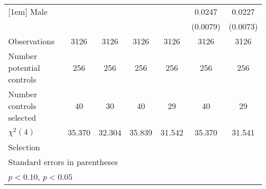{\begin{tabular}{l*{6}{c}}
[1em]
\hspace{3mm}Male    &                    &                    &                    &                    &      0.0247\sym{**}&      0.0227\sym{**}\\
                    &                    &                    &                    &                    &    (0.0079)        &    (0.0073)        \\
\hline
Observations        &        3126        &        3126        &        3126        &        3126        &        3126        &        3126        \\
Number potential controls&         256        &         256        &         256        &         256        &         256        &         256        \\
Number controls selected&          40        &          30        &          40        &          29        &          40        &          29        \\
$\chi^2(4)$         &      35.370        &      32.304        &      35.839        &      31.542        &      35.370        &      31.541        \\
Selection           &                    &                    &                    &                    &                    &                    \\
\hline\hline
\multicolumn{7}{l}{\footnotesize Standard errors in parentheses}\\
\multicolumn{7}{l}{\footnotesize \sym{*} \(p<0.10\), \sym{**} \(p<0.05\)}\\
\end{tabular}
}
